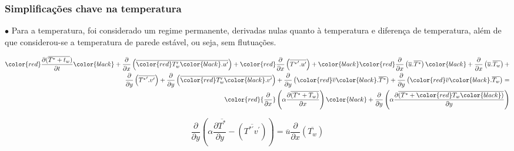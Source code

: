 \documentclass[xcolor=dvipsnames,10pt,aspectratio=169]{beamer}
\begin{document}
		\begin{frame}
		\frametitle{Simplificações chave na temperatura}
		$\bullet$ Para a temperatura, foi considerado um regime permanente, derivadas nulas quanto à temperatura e diferença de temperatura, além de que considerou-se a temperatura de parede estável, ou seja, sem flutuações. 
	 	\begin{center}
	 	\begin{equation*}
	 		\begin{split}
	 		\color{red}\frac{\partial ( \overline{ T^\ast + t_w } ) }{\partial t} \color{black} +
	 		\frac{\partial{}}{\partial{x}} \left(\overline{ \color{red}T_w^{\prime} \color{black}. u^{\prime}}\right) +
	 		\color{red}\frac{\partial{}}{\partial{x}} \left(\overline{{T^{\ast}}^{\prime} . u^{\prime}}\right)+ \color{black}
	 		\color{red} \frac{\partial{}}{\partial{x}}\left(\overline{u}. \overline{T^{\ast}}\right) \color{black}+ 
	 		\frac{\partial{}}{\partial{x}}\left(\overline{u}. \overline{T_w}\right)+ 
	 		\\
	 		\frac{\partial{}}{\partial{y}} \left(\overline{{T^{\ast}}^{\prime} .v^{\prime}}\right)+
	 		\frac{\partial{}}{\partial{y}} \left(\overline{\color{red}T_w^\prime \color{black}. v^\prime}\right) + \frac{\partial{}}{\partial{y}}\left(\color{red}\overline{v} \color{black}. \overline{T^\ast}\right) +
	 		\frac{\partial{}}{\partial{y}}\left(\color{red}\overline{v}\color{black}. \overline{T_w}\right) 
	 		= 
	 		\\
	 		\color{red}{\frac{\partial{}}{\partial{x}}} \left(\alpha {\frac{\partial{\overline{(T^\ast + T_w)}}}{\partial{x}}} \right) \color{black}+
	 		{\frac{\partial{}}{\partial{y}}} \left(\alpha {\frac{\partial{\overline{(T^\ast + \color{red} T_w \color{black})}}}{\partial{y}}} \right) 
	 		\end{split}
	 	\end{equation*}
 		\end{center}
 		\begin{equation}\label{equation_var}
 			{\frac{\partial{}}{\partial{y}}} \left(\alpha {\frac{\partial{\overline{T^\ast}}}{\partial{y}}}   
 			- \left(\overline{ T^{\ast\prime} v^\prime}\right) \right)
 			= 
 			\overline{u}\frac{\partial{}}{\partial{x}}\left(\overline{T_w}\right)  
 		\end{equation}
		\end{frame}
	
		
		
		
		
\end{document}

